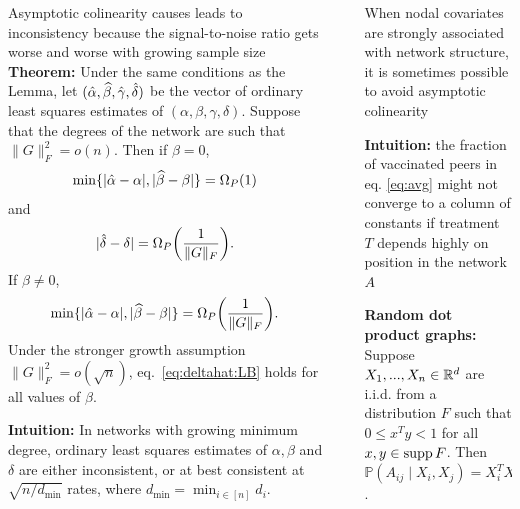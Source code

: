 \documentclass[final]{beamer}
\newlength{\sepwidth}
\newlength{\colwidth}
\newcommand{\separatorcolumn}{\begin{column}{\sepwidth}\end{column}}
\begin{document}
\begin{frame}[t]
\begin{columns}[t]
\begin{column}{\colwidth}
\begin{block}{Asymptotic colinearity causes leads to inconsistency because the signal-to-noise ratio gets worse and worse with growing sample size}
                \textbf{Theorem:} Under the same conditions as the Lemma, let $(\hat{\alpha}, \widehat{\beta}, \hat{\gamma}, \hat{\delta})$ be the vector of ordinary least squares estimates of $(\alpha, \beta, \gamma, \delta)$. Suppose that the degrees of the network are such that $\| G \|_F^2 = o(n)$.
                Then if $\beta = 0$,
                \begin{equation*}
                    \min\{ |\alphahat-\alpha|, |\betahat-\beta| \}
                    = \Omegap{ 1 }
                \end{equation*}
                and
                \begin{equation} \label{eq:deltahat:LB}
                    | \deltahat - \delta | = \Omegap{ \frac{1}{\|G\|_F} }.
                \end{equation}
                If $\beta \neq 0$,
                \begin{equation*}
                    \min\{ |\alphahat-\alpha|, |\betahat-\beta| \}
                    = \Omegap{ \frac{1}{\|G\|_F} }.
                \end{equation*}
                Under the stronger growth assumption $\|G\|_F^2 = o( \sqrt{n} )$, eq.~\eqref{eq:deltahat:LB} holds for all values of $\beta$.
                \vspace{3mm}

                \textbf{Intuition:} In networks with growing minimum degree, ordinary least squares estimates of $\alpha, \beta$ and $\delta$ are either inconsistent, or at best consistent at $\sqrt{n / d_\mathrm{min}}$ rates, where $d_\mathrm{min} = \min_{i \in [n]} d_i$.
            \end{block}
        \end{column}

        \separatorcolumn

        \begin{column}{\colwidth}
            \begin{block}{When nodal covariates are strongly associated with network structure, it is sometimes possible to avoid asymptotic colinearity}

                \textbf{Intuition:} the fraction of vaccinated peers in eq. \eqref{eq:avg} might not converge to a column of constants if treatment $T$ depends highly on position in the network $A$

                \textbf{Random dot product graphs:} Suppose $X_1, ..., X_n \in \mathbb{R}^d$ are i.i.d. from a distribution $F$ such that $0 \le x^T y < 1$ for all $x,y \in \operatorname*{supp} F$. Then $\mathbb{P}(A_{ij} \mid X_i, X_j) = X_i^T X_j$.


\end{block}
\end{column}
\end{columns}
\end{frame}
\end{document}
